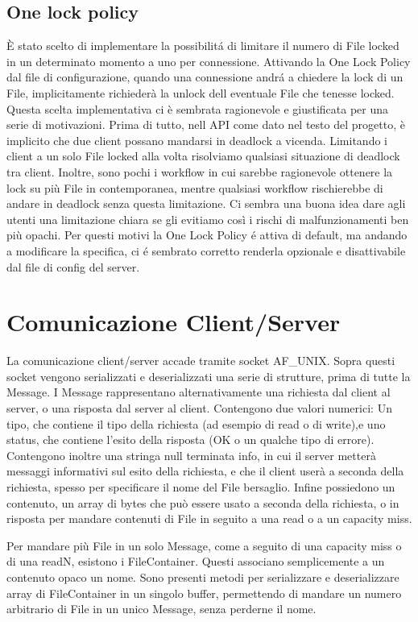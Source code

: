 \documentclass[11pt]{article}
\begin{document}
\begin{flushleft}
\subsection{One lock policy}
È stato scelto di implementare la possibilitá di limitare il numero di File locked in un determinato momento a uno per connessione. Attivando la One Lock Policy dal file di configurazione, quando una connessione andrá a chiedere la lock di un File, implicitamente richiederà la unlock dell eventuale File che tenesse locked.
Questa scelta implementativa ci è sembrata ragionevole e giustificata per una serie di motivazioni.
Prima di tutto, nell API come dato nel testo del progetto, è implicito che due client possano mandarsi in deadlock a vicenda. Limitando i client a un solo File locked alla volta risolviamo qualsiasi situazione di deadlock tra client.
Inoltre, sono pochi i workflow in cui sarebbe ragionevole ottenere la lock su più File in contemporanea, mentre qualsiasi workflow rischierebbe di andare in deadlock senza questa limitazione.
Ci sembra una buona idea dare agli utenti una limitazione chiara se gli evitiamo così i rischi di malfunzionamenti ben più opachi. 
Per questi motivi la One Lock Policy é attiva di default, ma andando a modificare la specifica, ci é sembrato corretto renderla opzionale e disattivabile dal file di config del server.
\section{Comunicazione Client/Server}

La comunicazione client/server accade tramite socket AF\_UNIX.
Sopra questi socket vengono serializzati e deserializzati una serie di strutture, prima di tutte la Message.
I Message rappresentano alternativamente una richiesta dal client al server, o una risposta dal server al client. Contengono due valori numerici: Un tipo, che contiene il tipo della richiesta (ad esempio di read o di write),e uno status, che contiene l'esito della risposta (OK o un qualche tipo di errore).
Contengono inoltre una stringa null terminata info, in cui il server metterà messaggi informativi sul esito della richiesta, e che il client userà a seconda della richiesta, spesso per specificare il nome del File bersaglio. Infine possiedono un contenuto, un array di bytes che può essere usato a seconda della richiesta, o in risposta per mandare contenuti di File in seguito a una read o a un capacity miss.

Per mandare più File in un solo Message, come a seguito di una capacity miss o di una readN, esistono i FileContainer. Questi associano semplicemente a un contenuto opaco un nome. Sono presenti metodi per serializzare e deserializzare array di FileContainer in un singolo buffer, permettendo di mandare un numero arbitrario di File in un unico Message, senza perderne il nome.


\end{flushleft}
\end{document}
